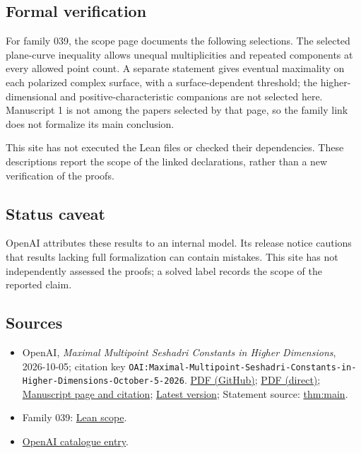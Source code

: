 \documentclass[11pt]{article}
\begin{document}
\subsection{Formal verification}
For family 039, the scope page documents the following selections. The selected plane-curve inequality allows unequal multiplicities and repeated components at every allowed point count. A separate statement gives eventual maximality on each polarized complex surface, with a surface-dependent threshold; the higher-dimensional and positive-characteristic companions are not selected here. Manuscript 1 is not among the papers selected by that page, so the family link does not formalize its main conclusion.

This site has not executed the Lean files or checked their dependencies. These descriptions report the scope of the linked declarations, rather than a new verification of the proofs.

\subsection{Status caveat}
OpenAI attributes these results to an internal model. Its release notice cautions that results lacking full formalization can contain mistakes. This site has not independently assessed the proofs; a solved label records the scope of the reported claim.

\subsection{Sources}
\begin{itemize}
\item OpenAI, \emph{Maximal Multipoint Seshadri Constants in Higher Dimensions}, 2026-10-05; citation key \texttt{OAI:Maximal-Multipoint-Seshadri-Constants-in-Higher-Dimensions-October-5-2026}. \href{https://github.com/openai/math/blob/adc7f1241b42e322a6451854ab7e4b4c146bf78a/preprints/Maximal-Multipoint-Seshadri-Constants-in-Higher-Dimensions-October-5-2026/main.pdf}{PDF (GitHub)}; \href{https://github.com/openai/math/raw/adc7f1241b42e322a6451854ab7e4b4c146bf78a/preprints/Maximal-Multipoint-Seshadri-Constants-in-Higher-Dimensions-October-5-2026/main.pdf}{PDF (direct)}; \href{https://github.com/openai/math/blob/adc7f1241b42e322a6451854ab7e4b4c146bf78a/preprints/Maximal-Multipoint-Seshadri-Constants-in-Higher-Dimensions-October-5-2026/README.md}{Manuscript page and citation}; \href{https://github.com/openai/math/blob/main/preprints/Maximal-Multipoint-Seshadri-Constants-in-Higher-Dimensions-October-5-2026/main.pdf}{Latest version}; Statement source: \href{https://github.com/openai/math/blob/adc7f1241b42e322a6451854ab7e4b4c146bf78a/preprints/Maximal-Multipoint-Seshadri-Constants-in-Higher-Dimensions-October-5-2026/build/sections/introduction.tex\#L29}{thm:main}.
\item Family 039: \href{https://github.com/openai/math/blob/adc7f1241b42e322a6451854ab7e4b4c146bf78a/lean/docs/039.md}{Lean scope}.
\item \href{https://github.com/openai/math/blob/adc7f1241b42e322a6451854ab7e4b4c146bf78a/CONTENTS.md}{OpenAI catalogue entry}.
\end{itemize}
\end{document}
